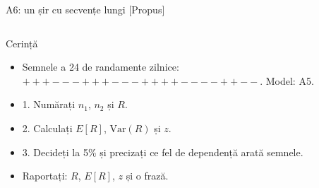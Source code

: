 \begin{frame}{A6: un șir cu secvențe lungi [Propus]}
\propsub
\itemsize{\scriptsize}
\begin{columns}[T]
\begin{column}{\taskw}
\begin{block}{Cerință}
\begin{itemize}
    \item Semnele a 24 de randamente zilnice: $+ + + - - - + + + - - - + + + + - - - - + + - -$. Model: A5.
    \item 1. Numărați $n_1$, $n_2$ și $R$.
    \item 2. Calculați $E[R]$, $\mathrm{Var}(R)$ și $z$.
    \item 3. Decideți la 5\% și precizați ce fel de dependență arată semnele.
    \item Raportați: $R$, $E[R]$, $z$ și o frază.
\end{itemize}
\end{block}
\end{column}
\begin{column}{\solw}
\end{column}
\end{columns}
\end{frame}

